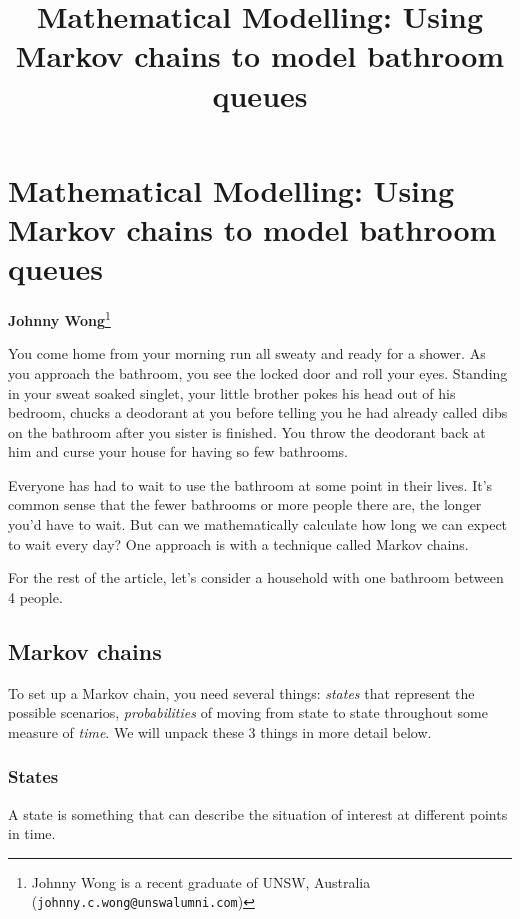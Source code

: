 \usetikzlibrary{automata, positioning}



\section*{Mathematical Modelling: Using Markov chains to model bathroom queues}
\vspace{-.30cm}

\title{Mathematical Modelling: Using Markov chains to model bathroom queues}

\begin{center}
	\textbf{Johnny Wong}\footnote{%
		Johnny Wong is a recent graduate of UNSW, Australia ({\tt johnny.c.wong@unswalumni.com})}
\end{center}

\vspace{5mm}

You come home from your morning run all sweaty and ready for a shower. As you approach the bathroom, you see the locked door and roll your eyes. Standing in your sweat soaked singlet, your little brother pokes his head out of his bedroom, chucks a deodorant at you before telling you he had already called dibs on the bathroom after you sister is finished. You throw the deodorant back at him and curse your house for having so few bathrooms.

Everyone has had to wait to use the bathroom at some point in their lives. It's common sense that the fewer bathrooms or more people there are, the longer you'd have to wait. But can we mathematically calculate how long we can expect to wait every day? One approach is with a technique called Markov chains.

For the rest of the article, let's consider a household with one bathroom between 4 people.

\subsection*{Markov chains}
To set up a Markov chain, you need several things: \textit{states} that represent the possible scenarios, \textit{probabilities} of moving from state to state throughout some measure of \textit{time}. We will unpack these 3 things in more detail below.

\subsubsection*{States}
A state is something that can describe the situation of interest at different points in time.


